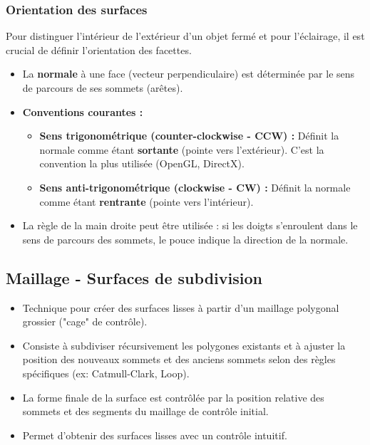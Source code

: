 \documentclass{article}
\begin{document}
\subsubsection{Orientation des surfaces}

Pour distinguer l'intérieur de l'extérieur d'un objet fermé et pour l'éclairage, il est crucial de définir l'orientation des facettes.
\begin{itemize}
    \item La \textbf{normale} à une face (vecteur perpendiculaire) est déterminée par le sens de parcours de ses sommets (arêtes).
    \item \textbf{Conventions courantes :}
        \begin{itemize}
            \item \textbf{Sens trigonométrique (counter-clockwise - CCW) :} Définit la normale comme étant \textbf{sortante} (pointe vers l'extérieur). C'est la convention la plus utilisée (OpenGL, DirectX).
            \item \textbf{Sens anti-trigonométrique (clockwise - CW) :} Définit la normale comme étant \textbf{rentrante} (pointe vers l'intérieur).
        \end{itemize}
    \item La règle de la main droite peut être utilisée : si les doigts s'enroulent dans le sens de parcours des sommets, le pouce indique la direction de la normale.
\end{itemize}

\subsection{Maillage - Surfaces de subdivision}

\begin{itemize}
    \item Technique pour créer des surfaces lisses à partir d'un maillage polygonal grossier ("cage" de contrôle).
    \item Consiste à subdiviser récursivement les polygones existants et à ajuster la position des nouveaux sommets et des anciens sommets selon des règles spécifiques (ex: Catmull-Clark, Loop).
    \item La forme finale de la surface est contrôlée par la position relative des sommets et des segments du maillage de contrôle initial.
    \item Permet d'obtenir des surfaces lisses avec un contrôle intuitif.
\end{itemize}
\end{document}

